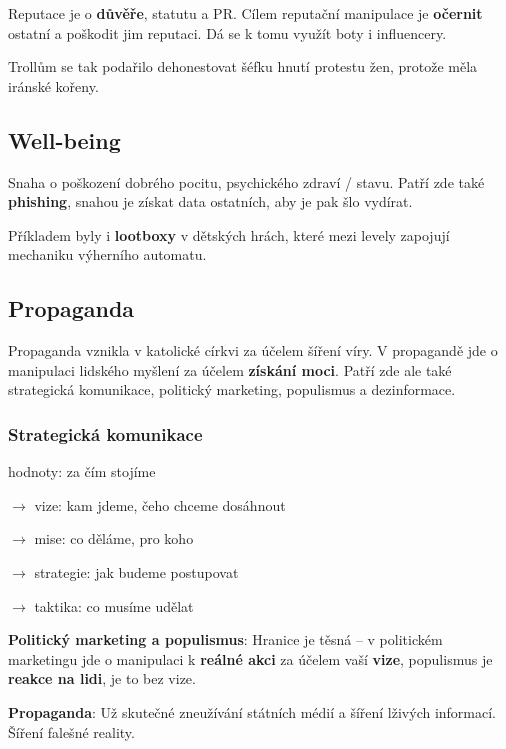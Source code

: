 Reputace je o \textbf{důvěře}, statutu a PR. Cílem reputační manipulace je \textbf{očernit} ostatní a poškodit jim reputaci. Dá se k tomu využít boty i influencery.

\vspace{4pt}
\noindent Trollům se tak podařilo dehonestovat šéfku hnutí protestu žen, protože měla iránské kořeny.

\subsection{Well-being}

Snaha o poškození dobrého pocitu, psychického zdraví / stavu. Patří zde také \textbf{phishing}, snahou je získat data ostatních, aby je pak šlo vydírat.

\vspace{4pt}
\noindent Příkladem byly i \textbf{lootboxy} v dětských hrách, které mezi levely zapojují mechaniku výherního automatu.

\subsection{Propaganda}

Propaganda vznikla v katolické církvi za účelem šíření víry. V propagandě jde o manipulaci lidského myšlení za účelem \textbf{získání moci}. Patří zde ale také strategická komunikace, politický marketing, populismus a dezinformace.

\subsubsection*{Strategická komunikace}

hodnoty: za čím stojíme

$\to$ vize: kam jdeme, čeho chceme dosáhnout

$\to$ mise: co děláme, pro koho

$\to$ strategie: jak budeme postupovat

$\to$ taktika: co musíme udělat

\vspace{6pt}
\noindent \textbf{Politický marketing a populismus}: Hranice je těsná -- v politickém marketingu jde o manipulaci k \textbf{reálné akci} za účelem vaší \textbf{vize}, populismus je \textbf{reakce na lidi}, je to bez vize.

\vspace{6pt}
\noindent \textbf{Propaganda}: Už skutečné zneužívání státních médií a šíření lživých informací. Šíření falešné reality.

